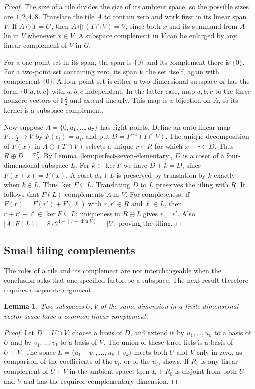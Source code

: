 \documentclass[11pt]{article}
\numberwithin{equation}{section}
\newtheorem{lemma}[theorem]{Lemma}
\theoremstyle{definition}
\theoremstyle{remark}\newtheorem{remark}[theorem]{Remark}
\begin{document}
\begin{proof}
The size of a tile divides the size of its ambient space, so the possible
sizes are $1,2,4,8$.  Translate the tile $A$ to contain zero and work first
in its linear span $V$.  If $A\oplus T=G$, then
$A\oplus(T\cap V)=V$, since both $x$ and its summand from $A$ lie in $V$
whenever $x\in V$.  A subspace complement in $V$ can be enlarged by any
linear complement of $V$ in $G$.

For a one-point set in its span, the span is $\{0\}$ and its
complement there is $\{0\}$. For a two-point set containing zero, its
span is the set itself, again with complement $\{0\}$.  A four-point set is
either a two-dimensional subspace or has the form $\{0,a,b,c\}$ with
$a,b,c$ independent.  In the latter case, map $a,b,c$ to the three nonzero
vectors of $\mathbb F_2^2$ and extend linearly.  This map is a bijection
on $A$, so its kernel is a subspace complement.

Now suppose $A=\{0,a_1,\ldots,a_7\}$ has eight points.  Define an onto
linear map $F:\mathbb F_2^7\to V$ by $F(e_i)=a_i$, and put
$D=F^{-1}(T\cap V)$.  The unique decomposition of $F(x)$ in
$A\oplus(T\cap V)$ selects a unique $r\in R$ for which $x+r\in D$.
Thus $R\oplus D=\mathbb F_2^7$.  By
Lemma~\ref{lem:perfect-seven-elementary}, $D$ is a coset of a
four-dimensional subspace $L$.  For $k\in\ker F$ we have $D+k=D$, since $F(x+k)=F(x)$.
A coset $d_0+L$ is preserved by translation by $k$ exactly when $k\in L$.
Thus $\ker F\subseteq L$.  Translating $D$ to $L$ preserves
the tiling with $R$.  It follows that $F(L)$ complements $A$ in $V$.
For completeness, if $F(r)=F(r')+F(\ell)$ with $r,r'\in R$ and
$\ell\in L$, then $r+r'+\ell\in\ker F\subseteq L$; uniqueness in
$R\oplus L$ gives $r=r'$.  Also
$|A||F(L)|=8\cdot2^{4-(7-\dim V)}=|V|$, proving the tiling.
\end{proof}

\subsection{Small tiling complements}

The roles of a tile and its complement are not interchangeable when the
conclusion asks that one specified factor be a subspace.  The next result
therefore requires a separate argument.

\begin{lemma}\label{lem:common-complement}
Two subspaces $U,V$ of the same dimension in a finite-dimensional vector
space have a common linear complement.
\end{lemma}
\begin{proof}
Let $D=U\cap V$, choose a basis of $D$, and extend it by
$u_1,\ldots,u_k$ to a basis of $U$ and by $v_1,\ldots,v_k$ to a basis
of $V$.  The union of these three lists is a basis of $U+V$.  The space
$L=\langle u_1+v_1,\ldots,u_k+v_k\rangle$ meets both $U$ and $V$
only in zero, as comparison of the coefficients of the $v_i$, or of the
$u_i$, shows.  If $R_0$ is any linear complement of $U+V$ in the ambient
space, then $L+R_0$ is disjoint from both $U$ and $V$ and has the required
complementary dimension.
\end{proof}
\end{document}
